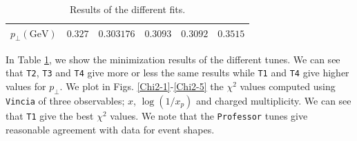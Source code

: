 \documentclass[aps,preprint,floatfix,nofootinbib,showpacs]{revtex4-1}
\begin{document}
\begin{table}[!h]
\begin{center}
\begin{tabular}{l|l|l|l|l|l}
    $p_\perp (\text{GeV})$  & \hspace{1cm} $0.327$ \hspace{0.5cm} & \hspace{1cm} $0.303176$ \hspace{0.5cm}  & \hspace{1cm} $0.3093$ \hspace{0.5cm} & \hspace{1cm} $0.3092$ \hspace{0.5cm} & \hspace{1cm} $0.3515$ \hspace{0.5cm}\\ \hline \hline
   \end{tabular}
  \end{center}
  \caption{Results of the different fits.}
  \label{Fit-1}
 \end{table}
 In Table \ref{Fit-1}, we show the minimization results of the different tunes. We can see 
 that \texttt{T2}, \texttt{T3} and \texttt{T4} give more or less the same results while
 \texttt{T1} and \texttt{T4} give higher values for $p_\perp$. We plot in Figs. \ref{Chi2-1}-\ref{Chi2-5}  the 
 $\chi^2$ values computed using \texttt{Vincia} of three observables; $x$, $\log(1/x_p)$ and charged multiplicity.
 We can see that \texttt{T1} give the best $\chi^2$ values. We note that the \texttt{Professor} tunes
 give reasonable agreement with data for event shapes.
\end{document}
